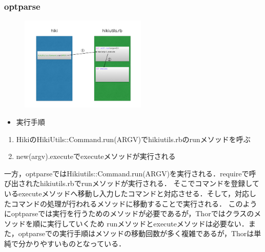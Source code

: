 \subsubsection{optparse}
\begin{figure}[htbp]\begin{center}
\includegraphics[width=6cm,bb=0 0 442 432]{../figs/./hikiutils_yamane_09_copy.007.jpg}
\caption{}
\label{default}\end{center}\end{figure}
\begin{itemize}
\item 実行手順
\end{itemize}
\begin{enumerate}
\item HikiのHikiUtils::Command.run(ARGV)でhikiutils.rbのrunメソッドを呼ぶ
\item new(argv).executeでexecuteメソッドが実行される
\end{enumerate}
一方，optparseではHikiutils::Command.run(ARGV)を実行される．requireで呼び出されたhikiutils.rbでrunメソッドが実行される．
そこでコマンドを登録しているexecuteメソッドへ移動し入力したコマンドと対応させる．そして，対応したコマンドの処理が行われるメソッドに移動することで実行される．
このようにoptparseでは実行を行うためのメソッドが必要であるが，Thorではクラスのメソッドを順に実行していくため
runメソッドとexecuteメソッドは必要ない．また，optparseでの実行手順はメソッドの移動回数が多く複雑であるが，Thorは単純で分かりやすいものとなっている．

